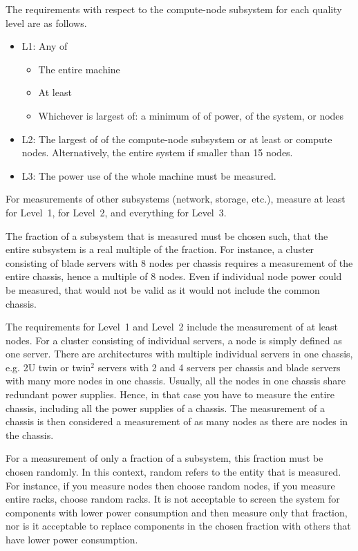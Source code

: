 The requirements with respect to the compute-node subsystem for each quality level are as follows.

\begin{itemize}
\item
L1: Any of
\begin{itemize}
\item The entire machine
\item At least \SpecPowerMaxLOne{}
\item Whichever is largest of: a minimum of \SpecPowerMinLOne{} of power, \SpecFracMinLOne{} of the system, or \SpecMinNodes{} nodes
\end{itemize}

\item
L2: The largest of \SpecFracMinLTwo{} of the compute-node subsystem or at least \SpecPowerMinLTwo{} or \SpecMinNodes{} compute nodes.
Alternatively, the entire system if smaller than \num{15} nodes.
\item
L3: The power use of the whole machine must be measured.
\end{itemize}

For measurements of other subsystems (network, storage, etc.), measure at least \SpecFracMinLOne{} for Level~1, \SpecFracMinLTwo{} for Level~2, and everything for Level~3.

The fraction of a subsystem that is measured must be chosen such, that the entire subsystem is a real multiple of the fraction.
For instance, a cluster consisting of blade servers with \num{8} nodes per chassis requires a measurement of the entire chassis, hence a multiple of \num{8} nodes.
Even if individual node power could be measured, that would not be valid as it would not include the common chassis.

The requirements for Level~1 and Level~2 include the measurement of at least \SpecMinNodes{} nodes.
For a cluster consisting of individual servers, a node is simply defined as one server.
There are architectures with multiple individual servers in one chassis, e.g.
2U twin or twin$^2$ servers with \num{2} and \num{4} servers per chassis and blade servers with many more nodes in one chassis.
Usually, all the nodes in one chassis share redundant power supplies.
Hence, in that case you have to measure the entire chassis, including all the power supplies of a chassis.
The measurement of a chassis is then considered a measurement of as many nodes as there are nodes in the chassis.

For a measurement of only a fraction of a subsystem, this fraction must be chosen randomly.
In this context, random refers to the entity that is measured.
For instance, if you measure nodes then choose random nodes, if you measure entire racks, choose random racks.
It is not acceptable to screen the system for components with lower power consumption and then measure only that fraction, nor is it acceptable to replace components in the chosen fraction with others that have lower power consumption.

